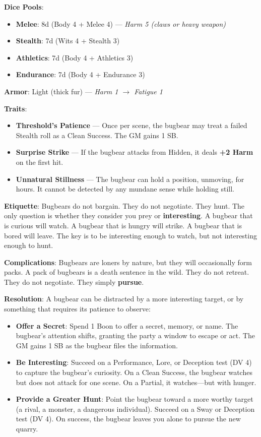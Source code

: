 \textbf{Dice Pools}:
\begin{itemize}
    \item \textbf{Melee}: 8d (Body 4 + Melee 4) --- \textit{Harm 5 (claws or heavy weapon)}
    \item \textbf{Stealth}: 7d (Wits 4 + Stealth 3)
    \item \textbf{Athletics}: 7d (Body 4 + Athletics 3)
    \item \textbf{Endurance}: 7d (Body 4 + Endurance 3)
\end{itemize}

\textbf{Armor}: Light (thick fur) --- \textit{Harm 1 $\rightarrow$ Fatigue 1}

\textbf{Traits}:
\begin{itemize}
    \item \textbf{Threshold's Patience} --- Once per scene, the bugbear may treat a failed Stealth roll as a Clean Success. The GM gains 1 SB.
    \item \textbf{Surprise Strike} --- If the bugbear attacks from Hidden, it deals \textbf{+2 Harm} on the first hit.
    \item \textbf{Unnatural Stillness} --- The bugbear can hold a position, unmoving, for hours. It cannot be detected by any mundane sense while holding still.
\end{itemize}

\textbf{Etiquette}: Bugbears do not bargain. They do not negotiate. They hunt. The only question is whether they consider you prey or \textbf{interesting}. A bugbear that is curious will watch. A bugbear that is hungry will strike. A bugbear that is bored will leave. The key is to be interesting enough to watch, but not interesting enough to hunt.

\textbf{Complications}: Bugbears are loners by nature, but they will occasionally form packs. A pack of bugbears is a death sentence in the wild. They do not retreat. They do not negotiate. They simply \textbf{pursue}.

\textbf{Resolution}: A bugbear can be distracted by a more interesting target, or by something that requires its patience to observe:
\begin{itemize}
    \item \textbf{Offer a Secret}: Spend 1 Boon to offer a secret, memory, or name. The bugbear's attention shifts, granting the party a window to escape or act. The GM gains 1 SB as the bugbear files the information.
    \item \textbf{Be Interesting}: Succeed on a Performance, Lore, or Deception test (DV 4) to capture the bugbear's curiosity. On a Clean Success, the bugbear watches but does not attack for one scene. On a Partial, it watches---but with hunger.
    \item \textbf{Provide a Greater Hunt}: Point the bugbear toward a more worthy target (a rival, a monster, a dangerous individual). Succeed on a Sway or Deception test (DV 4). On success, the bugbear leaves you alone to pursue the new quarry.
\end{itemize}

